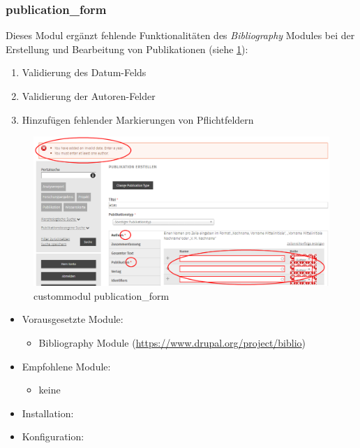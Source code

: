 \subsubsection{publication\_form}\label{subsub:publicationform}
Dieses Modul ergänzt fehlende Funktionalitäten des \textit{Bibliography} Modules bei der Erstellung und Bearbeitung von Publikationen (siehe \cref{fig:example_publicationform}):
\begin{enumerate}
	\item Validierung des Datum-Felds
	\item Validierung der Autoren-Felder
	\item Hinzufügen fehlender Markierungen von Pflichtfeldern
\end{enumerate}

\begin{figure}[H]
	\centering
	\includegraphics[height=0.20\textheight]{images/example_publicationform}
	\caption{\gls{custommodul} publication\_form}
	\label{fig:example_publicationform}
\end{figure}

\begin{itemize}[parsep=0pt, itemsep=5.0pt plus 2.0pt minus 1.0pt, leftmargin=*]
	\item Vorausgesetzte Module:
	\begin{itemize}
		\item Bibliography Module (\url{https://www.drupal.org/project/biblio})
	\end{itemize}
	
	\item Empfohlene Module:
	\begin{itemize}
		\item keine
	\end{itemize}
	
	\item Installation: \standardinstall
	
	\item Konfiguration: 
	
	\noconfig
	
	
\end{itemize}


